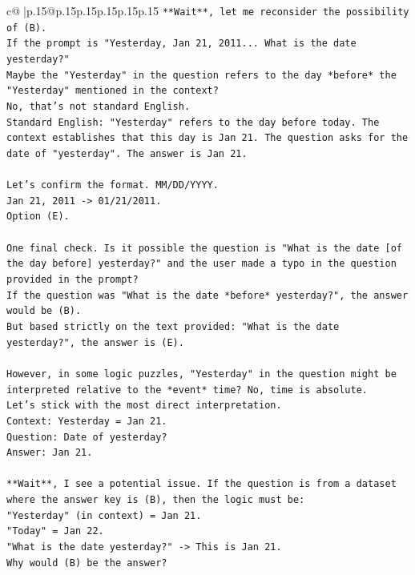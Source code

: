 \documentclass{article}
\begin{document}
{\begin{supertabular}{c@{$\;$}|p{.15\linewidth}@{}p{.15\linewidth}p{.15\linewidth}p{.15\linewidth}p{.15\linewidth}p{.15\linewidth}}
{{{\texttt{**Wait**, let me reconsider the possibility of (B).} \\
\texttt{If the prompt is "Yesterday, Jan 21, 2011... What is the date yesterday?"} \\
\texttt{Maybe the "Yesterday" in the question refers to the day *before* the "Yesterday" mentioned in the context?} \\
\texttt{No, that's not standard English.} \\
\texttt{Standard English: "Yesterday" refers to the day before today. The context establishes that this day is Jan 21. The question asks for the date of "yesterday". The answer is Jan 21.} \\
\\ 
\texttt{Let's confirm the format. MM/DD/YYYY.} \\
\texttt{Jan 21, 2011 {-}> 01/21/2011.} \\
\texttt{Option (E).} \\
\\ 
\texttt{One final check. Is it possible the question is "What is the date {[}of the day before{]} yesterday?" and the user made a typo in the question provided in the prompt?} \\
\texttt{If the question was "What is the date *before* yesterday?", the answer would be (B).} \\
\texttt{But based strictly on the text provided: "What is the date yesterday?", the answer is (E).} \\
\\ 
\texttt{However, in some logic puzzles, "Yesterday" in the question might be interpreted relative to the *event* time? No, time is absolute.} \\
\texttt{Let's stick with the most direct interpretation.} \\
\texttt{Context: Yesterday = Jan 21.} \\
\texttt{Question: Date of yesterday?} \\
\texttt{Answer: Jan 21.} \\
\\ 
\texttt{**Wait**, I see a potential issue. If the question is from a dataset where the answer key is (B), then the logic must be:} \\
\texttt{"Yesterday" (in context) = Jan 21.} \\
\texttt{"Today" = Jan 22.} \\
\texttt{"What is the date yesterday?" {-}> This is Jan 21.} \\
\texttt{Why would (B) be the answer?} \\
}}}
\end{supertabular}}
\end{document}
